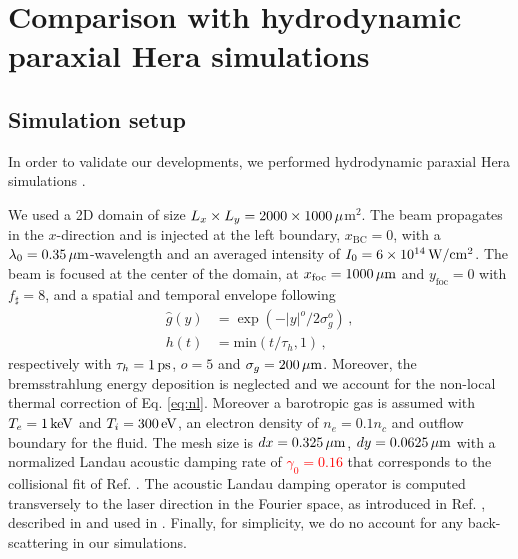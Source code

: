 \documentclass[
 reprint,
 amsmath,amssymb,
 aps,
]{revtex4-1}
\def\tc{\textcolor{red}}
\begin{document}
\section{Comparison with hydrodynamic paraxial Hera simulations}
\subsection{Simulation setup}
In order to validate our developments, we performed hydrodynamic  paraxial Hera simulations \cite[]{Loiseau_2006}.

We used a 2D domain of size $L_x \times L_y = 2000 \times 1000\, \rm \mu$m$^2$. 
The beam propagates in the $x$-direction and is injected at the left boundary, $x_\mathrm{BC}=0$, with a  $\lambda_0=0.35\, \rm\mu m$-wavelength and an averaged intensity of $I_0=6\times 10^{14}\, \rm W/cm^2$.
The beam is focused at the center of the domain, at 
$x_\mathrm{foc}=1000\, \rm \mu m$ and $y_\mathrm{foc}=0$ with  $f_\sharp = 8$, and
a spatial and temporal envelope following
\begin{align}
    \hat{g}(y) &= \exp(-\vert y\vert ^o/2\sigma_g^o)  \, ,  \label{eq:g}\\
    h(t) &= \mathrm{min}(t/\tau_h,1) \, ,\label{eq:h}
\end{align}
respectively with $\tau_h=1\, \rm ps$,  $o=5$ and $\sigma_g = 200\,\rm \mu m$.  
Moreover, the bremsstrahlung energy deposition is neglected and we account for the non-local thermal correction of Eq. \eqref{eq:nl}.  
Moreover a barotropic gas is assumed  with $T_e=1\,\rm keV$ and $T_i=300\,\rm eV$, an electron density of $n_e =0.1n_c $ and outflow boundary for the fluid.
The mesh size is $dx =0.325\,\rm \mu m$, $dy = 0.0625\, \rm \mu m$
with a normalized Landau acoustic damping rate of \tc{$\gamma_0=0.16$} that corresponds to the collisional fit of Ref. \cite[]{casanova_1989}. 
The acoustic Landau damping operator is computed transversely to the laser direction in the Fourier space, as introduced in Ref. \cite[]{POP_Rose_96}, described in \cite[]{Berger_98} and used in   \cite{phd-PEML,Masson_2006,Huller_2008}.
Finally, for simplicity, we do no account for any back-scattering in our  simulations. 
\end{document}
